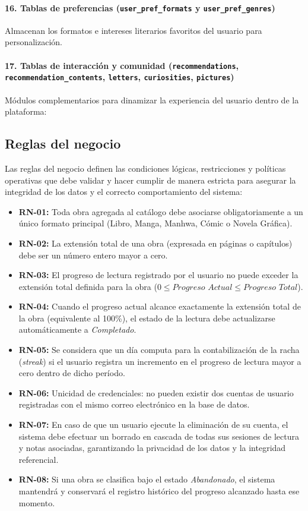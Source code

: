 \documentclass[12pt, atypical, journal]{article}
\begin{document}
\paragraph{16. Tablas de preferencias (\texttt{user\_pref\_formats} y \texttt{user\_pref\_genres})}
Almacenan los formatos e intereses literarios favoritos del usuario para personalización.

\paragraph{17. Tablas de interacción y comunidad (\texttt{recommendations}, \texttt{recommendation\_contents}, \texttt{letters}, \texttt{curiosities}, \texttt{pictures})}
Módulos complementarios para dinamizar la experiencia del usuario dentro de la plataforma:

\subsection{Reglas del negocio}
Las reglas del negocio definen las condiciones lógicas, restricciones y políticas operativas que debe validar y hacer cumplir de manera estricta para asegurar la integridad de los datos y el correcto comportamiento del sistema:

\begin{itemize}
	\item \textbf{RN-01:} Toda obra agregada al catálogo debe asociarse obligatoriamente a un único formato principal (Libro, Manga, Manhwa, Cómic o Novela Gráfica).
	\item \textbf{RN-02:} La extensión total de una obra (expresada en páginas o capítulos) debe ser un número entero mayor a cero.
	\item \textbf{RN-03:} El progreso de lectura registrado por el usuario no puede exceder la extensión total definida para la obra ($0 \le \textit{Progreso Actual} \le \textit{Progreso Total}$).
	\item \textbf{RN-04:} Cuando el progreso actual alcance exactamente la extensión total de la obra (equivalente al 100\%), el estado de la lectura debe actualizarse automáticamente a \textit{Completado}.
	\item \textbf{RN-05:} Se considera que un día computa para la contabilización de la racha (\textit{streak}) si el usuario registra un incremento en el progreso de lectura mayor a cero dentro de dicho período.
	\item \textbf{RN-06:} Unicidad de credenciales: no pueden existir dos cuentas de usuario registradas con el mismo correo electrónico en la base de datos.
	\item \textbf{RN-07:} En caso de que un usuario ejecute la eliminación de su cuenta, el sistema debe efectuar un borrado en cascada de todas sus sesiones de lectura y notas asociadas, garantizando la privacidad de los datos y la integridad referencial.
	\item \textbf{RN-08:} Si una obra se clasifica bajo el estado \textit{Abandonado}, el sistema mantendrá y conservará el registro histórico del progreso alcanzado hasta ese momento.
\end{itemize}
\end{document}
